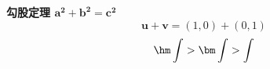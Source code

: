 \textbf{勾股定理 $\bm{a^2+b^2=c^2}$}
\[  \bm u + \bm v = (1,0) + (0,1)  \]
\[  \hm\int > \bm\int > \int  \]
